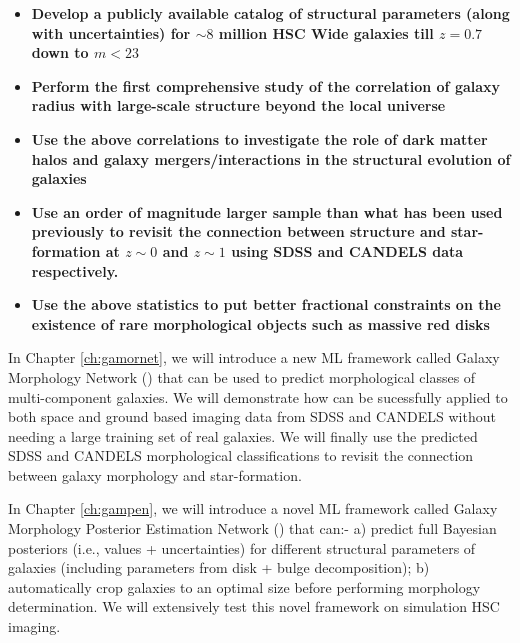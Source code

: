 \begin{tcolorbox}[breakable,colback=blue!5!white,colframe=blue!75!black,title=\textbf{Key Science Goals}]
\begin{itemize}
 \setlength\itemsep{-0.1em}
\item \textbf{Develop a publicly available catalog of structural parameters (along with uncertainties) for $\sim8$ million HSC Wide galaxies till $z=0.7$ down to $m < 23$}
\end{itemize}
\tcblower
\begin{itemize}
\setlength\itemsep{-0.1em}
\item \textbf{Perform the first comprehensive study of the correlation of galaxy radius with large-scale structure beyond the local universe}
\item \textbf{Use the above correlations to investigate the role of dark matter halos and galaxy mergers/interactions in the structural evolution of galaxies}
\end{itemize}
\vspace{-0.25in}
\DrawLine
\vspace{-0.15in}
\begin{itemize}
\setlength\itemsep{-0.1em}
\item \textbf{Use an order of magnitude larger sample than what has been used previously to revisit the connection between structure and star-formation at $z\sim0$ and $z\sim1$ using SDSS and CANDELS data respectively.}
\item \textbf{Use the above statistics to put better fractional constraints on the existence of rare morphological objects such as massive red disks}
\end{itemize}
\end{tcolorbox}

In Chapter \ref{ch:gamornet}, we will introduce a new ML framework called Galaxy Morphology Network (\gamornet) that can be used to predict morphological classes of multi-component galaxies. We will demonstrate how \gamornet{} can be sucessfully applied to both space and ground based imaging data from SDSS and CANDELS without needing a large training set of real galaxies. We will finally use the predicted SDSS and CANDELS morphological classifications to revisit the connection between galaxy morphology and star-formation.

In Chapter \ref{ch:gampen}, we will introduce a novel ML framework called Galaxy Morphology Posterior Estimation Network (\gampen{}) that can:- a) predict full Bayesian posteriors (i.e., values + uncertainties) for different structural parameters of galaxies (including parameters from disk + bulge decomposition); b) automatically crop galaxies to an optimal size before performing morphology determination. We will extensively test this novel framework on simulation HSC imaging.

